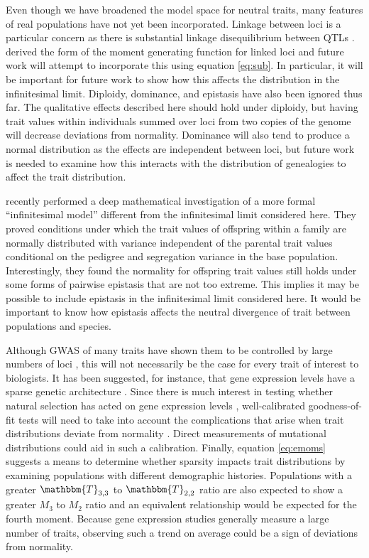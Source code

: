 Even though we have broadened the model space for neutral traits, many features
of real populations have not yet been incorporated. Linkage between loci is a
particular concern as there is substantial linkage disequilibrium between QTLs
\citep{Bulik-Sullivan2015}. \citet{Lohse2011} derived the form of the moment
generating function for linked loci and future work will attempt to incorporate
this using equation \eqref{eq:sub}. In particular, it will be important for
future work to show how this affects the distribution in the infinitesimal
limit. Diploidy, dominance, and epistasis have also been ignored thus far. The
qualitative effects described here should hold under diploidy, but having trait
values within individuals summed over loci from two copies of the genome will
decrease deviations from normality. Dominance will also tend to produce a normal
distribution as the effects are independent between loci, but future work is
needed to examine how this interacts with the distribution of genealogies to
affect the trait distribution.

\citet{Barton2017} recently performed a deep mathematical investigation of a
more formal ``infinitesimal model'' different from the infinitesimal limit
considered here. They proved conditions under which the trait values of
offspring within a family are normally distributed with variance independent of
the parental trait values conditional on the pedigree and segregation variance
in the base population. Interestingly, they found the normality for offspring
trait values still holds under some forms of pairwise epistasis that are not too
extreme. This implies it may be possible to include epistasis in the
infinitesimal limit considered here. It would be important to know how epistasis
affects the neutral divergence of trait between populations and species.

Although GWAS of many traits have shown them to be controlled by large numbers
of loci \citep{Boyle2017}, this will not necessarily be the case for every trait
of interest to biologists. It has been suggested, for instance, that gene
expression levels have a sparse genetic architecture \citep{Wheeler2016}. Since
there is much interest in testing whether natural selection has acted on gene
expression levels \citep{Whitehead2006,Gilad2006,Yang2017}, well-calibrated
goodness-of-fit tests will need to take into account the complications that
arise when trait distributions deviate from normality \citep{Khaitovich2005}.
Direct measurements of mutational distributions \citep{Gruber2012,Metzger2016}
could aid in such a calibration. Finally, equation \eqref{eq:emoms} suggests a
means to determine whether sparsity impacts trait distributions by examining
populations with different demographic histories. Populations with a greater
$\mathbbm{T}_{3,3}$ to $\mathbbm{T}_{2,2}$ ratio are also expected to show a
greater $M_3$ to $M_2$ ratio and an equivalent relationship would be expected
for the fourth moment. Because gene expression studies generally measure a large
number of traits, observing such a trend on average could be a sign of
deviations from normality.

